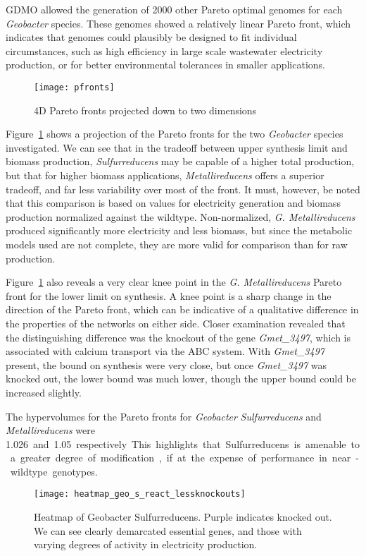 \documentclass[a4paper,twocolumn]{article}
\begin{document}
GDMO allowed the generation of 2000 other Pareto optimal genomes for each {\it Geobacter} species. These genomes showed a relatively linear Pareto front, which indicates that genomes could plausibly be designed to fit individual circumstances, such as high efficiency in large scale wastewater electricity production, or for better environmental tolerances in smaller applications.

\begin{figure}[!h]
\texttt{[image: pfronts]}
\caption{4D Pareto fronts projected down to two dimensions}
\label{fig:pfronts}
\end{figure}

Figure~\ref{fig:pfronts} shows a projection of the Pareto fronts for the two {\it Geobacter} species investigated. We can see that in the tradeoff between upper synthesis limit and biomass production, {\it Sulfurreducens} may be capable of a higher total production, but that for higher biomass applications, {\it Metallireducens }offers a superior tradeoff, and far less variability over most of the front. It must, however, be noted that this comparison is based on values for electricity generation and biomass production normalized against the wildtype. Non-normalized, {\it G. Metallireducens} produced significantly more electricity and less biomass, but since the metabolic models used are not complete, they are more valid for comparison than for raw production.

Figure~\ref{fig:pfronts} also reveals a very clear knee point in the {\it G. Metallireducens} Pareto front for the lower limit on synthesis. A knee point is a sharp change in the direction of the Pareto front, which can be indicative of a qualitative difference in the properties of the networks on either side. Closer examination revealed that the distinguishing difference was the knockout of the gene {\it Gmet\_3497}, which is associated with calcium transport via the ABC system. With {\it Gmet\_3497} present, the bound on synthesis were very close, but once {\it Gmet\_3497} was knocked out, the lower bound was much lower, though the upper bound could be increased slightly.

The hypervolumes for the Pareto fronts for {\it Geobacter} {\it Sulfurreducens} and {\it Metallireducens} were \SI{1.026} and \SI{1.05} respectively. This highlights that Sulfurreducens is amenable to a greater degree of modification, if at the expense of performance in near-wildtype genotypes.

\begin{figure}[!htb]
\texttt{[image: heatmap\_geo\_s\_react\_lessknockouts]}
\caption{Heatmap of Geobacter Sulfurreducens. Purple indicates knocked out. We can see clearly demarcated essential genes, and those with varying degrees of activity in electricity production.}
\label{fig:heatmap}
\end{figure}
\end{document}
